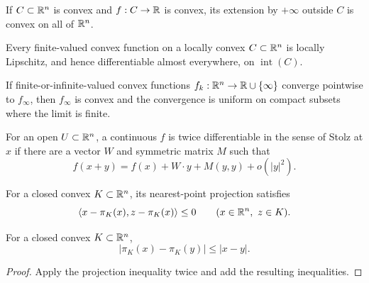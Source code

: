 \begin{remark}
\label{rem:chow-iii-h4-extended-convex-extension}
If $C\subset\mathbb R^n$ is convex and $f:C\to\mathbb R$ is convex, its extension by $+\infty$
outside $C$ is convex on all of $\mathbb R^n$.
\end{remark}

\begin{proposition}
\label{prop:chow-iii-h5-convex-lipschitz}
Every finite-valued convex function on a locally convex $C\subset\mathbb R^n$ is locally
Lipschitz, and hence differentiable almost everywhere, on $\operatorname{int}(C)$.
\end{proposition}

\begin{lemma}
\label{lem:chow-iii-h6-convex-limits}
If finite-or-infinite-valued convex functions $f_k:\mathbb R^n\to\mathbb R\cup\{\infty\}$ converge
pointwise to $f_\infty$, then $f_\infty$ is convex and the convergence is uniform on
compact subsets where the limit is finite.
\end{lemma}

\begin{definition}
\label{def:chow-iii-h7-stolz-differentiability}
For an open $U\subset\mathbb R^n$, a continuous $f$ is twice differentiable in the sense of
Stolz at $x$ if there are a vector $W$ and symmetric matrix $M$ such that
\[
f(x+y)=f(x)+W\cdot y+M(y,y)+o(|y|^2).
\]
\end{definition}

\begin{lemma}
\label{lem:chow-iii-h8-projection-inequality}
For a closed convex $K\subset\mathbb R^n$, its nearest-point projection satisfies
\[
\langle x-\pi_K(x),z-\pi_K(x)\rangle\le0
\qquad(x\in\mathbb R^n,\ z\in K).
\]
\end{lemma}

\begin{proposition}
\label{prop:chow-iii-h9-projection-contraction}
For a closed convex $K\subset\mathbb R^n$,
\[
|\pi_K(x)-\pi_K(y)|\le |x-y|.
\]
\end{proposition}
\begin{proof}
Apply the projection inequality twice and add the resulting inequalities.
\end{proof}


